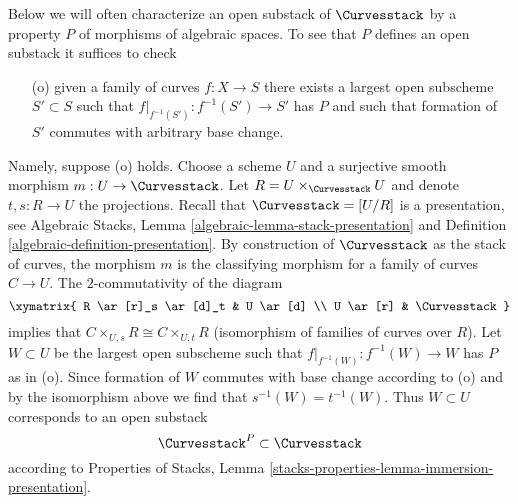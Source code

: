 \noindent
Below we will often characterize an open substack of $\Curvesstack$
by a property $P$ of morphisms of algebraic spaces. To see that $P$
defines an open substack it suffices to check
\begin{enumerate}
\item[(o)] given a family of curves $f : X \to S$ there exists
a largest open subscheme $S' \subset S$ such that
$f|_{f^{-1}(S')} : f^{-1}(S') \to S'$ has $P$ and such that
formation of $S'$ commutes with arbitrary base change.
\end{enumerate}
Namely, suppose (o) holds. Choose a scheme $U$ and a surjective
smooth morphism $m : U \to \Curvesstack$. Let
$R = U \times_{\Curvesstack} U$ and denote $t, s : R \to U$
the projections. Recall that $\Curvesstack = [U/R]$ is a presentation,
see Algebraic Stacks, Lemma \ref{algebraic-lemma-stack-presentation} and
Definition \ref{algebraic-definition-presentation}.
By construction of $\Curvesstack$ as
the stack of curves, the morphism $m$ is the classifying morphism
for a family of curves $C \to U$. The $2$-commutativity
of the diagram
$$
\xymatrix{
R \ar[r]_s \ar[d]_t & U \ar[d] \\
U \ar[r] & \Curvesstack
}
$$
implies that $C \times_{U, s} R  \cong C \times_{U, t} R$
(isomorphism of families of curves over $R$). Let $W \subset U$
be the largest open subscheme such that
$f|_{f^{-1}(W)} : f^{-1}(W) \to W$ has $P$ as in (o).
Since formation of $W$ commutes with base change according to (o)
and by the isomorphism above we find that $s^{-1}(W) = t^{-1}(W)$.
Thus $W \subset U$ corresponds to an open substack
$$
\Curvesstack^P \subset \Curvesstack
$$
according to Properties of Stacks, Lemma
\ref{stacks-properties-lemma-immersion-presentation}.

